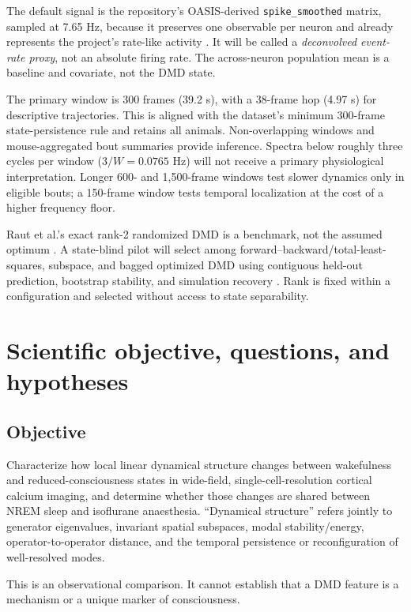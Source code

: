 \documentclass[11pt,a4paper]{article}
\begin{document}
The default signal is the repository's OASIS-derived \texttt{spike\_smoothed} matrix, sampled at 7.65 Hz, because it preserves one observable per neuron and already represents the project's rate-like activity \citep{friedrich2017,kiyooka2026}. It will be called a \emph{deconvolved event-rate proxy}, not an absolute firing rate. The across-neuron population mean is a baseline and covariate, not the DMD state.

The primary window is 300 frames (39.2 s), with a 38-frame hop (4.97 s) for descriptive trajectories. This is aligned with the dataset's minimum 300-frame state-persistence rule and retains all animals. Non-overlapping windows and mouse-aggregated bout summaries provide inference. Spectra below roughly three cycles per window ($3/W=0.0765$ Hz) will not receive a primary physiological interpretation. Longer 600- and 1,500-frame windows test slower dynamics only in eligible bouts; a 150-frame window tests temporal localization at the cost of a higher frequency floor.

Raut et al.'s exact rank-2 randomized DMD is a benchmark, not the assumed optimum \citep{raut2025}. A state-blind pilot will select among forward--backward/total-least-squares, subspace, and bagged optimized DMD using contiguous held-out prediction, bootstrap stability, and simulation recovery \citep{dawson2016,hemati2017,takeishi2017,askham2018,sashidhar2022}. Rank is fixed within a configuration and selected without access to state separability.

\section{Scientific objective, questions, and hypotheses}

\subsection{Objective}

Characterize how local linear dynamical structure changes between wakefulness and reduced-consciousness states in wide-field, single-cell-resolution cortical calcium imaging, and determine whether those changes are shared between NREM sleep and isoflurane anaesthesia. ``Dynamical structure'' refers jointly to generator eigenvalues, invariant spatial subspaces, modal stability/energy, operator-to-operator distance, and the temporal persistence or reconfiguration of well-resolved modes.

This is an observational comparison. It cannot establish that a DMD feature is a mechanism or a unique marker of consciousness.
\end{document}
